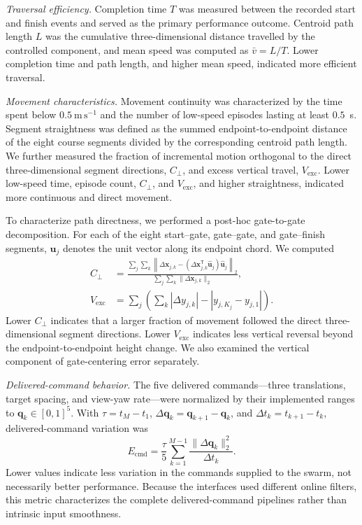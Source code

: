 \emph{Traversal efficiency.}
Completion time $T$ was measured between the recorded start and finish events
and served as the primary performance outcome. Centroid path length $L$ was the
cumulative three-dimensional distance travelled by the controlled component,
and mean speed was computed as $\bar v=L/T$. Lower completion time and path
length, and higher mean speed, indicated more efficient traversal.

\emph{Movement characteristics.}
Movement continuity was characterized by the time spent below $0.5~\mathrm{m\,s^{-1}}$
and the number of low-speed episodes lasting at least $0.5$~s. Segment
straightness was defined as the summed endpoint-to-endpoint distance of the
eight course segments divided by the corresponding centroid path length.
We further measured the fraction of incremental motion orthogonal to the direct
three-dimensional segment directions, $C_{\perp}$, and excess vertical travel,
$V_{\mathrm{exc}}$. Lower low-speed time, episode count, $C_{\perp}$, and
$V_{\mathrm{exc}}$, and higher straightness, indicated more continuous and
direct movement.

To characterize path directness, we performed a post-hoc gate-to-gate
decomposition. For each of the eight start--gate, gate--gate, and gate--finish
segments, $\hat{\mathbf{u}}_j$ denotes the unit vector along its endpoint chord.
We computed
\begin{equation}
\begin{aligned}
C_{\perp}
&=
\frac{
\sum_j\sum_k
\left\|
\Delta\mathbf{x}_{j,k}
-(\Delta\mathbf{x}_{j,k}^{\mathsf T}\hat{\mathbf{u}}_j)
 \hat{\mathbf{u}}_j
\right\|_2
}{
\sum_j\sum_k\lVert\Delta\mathbf{x}_{j,k}\rVert_2
},\\
V_{\mathrm{exc}}
&=
\sum_j
\left(
\sum_k |\Delta y_{j,k}|
-
|y_{j,K_j}-y_{j,1}|
\right).
\end{aligned}
\label{eq:trajectory_geometry}
\end{equation}
Lower $C_{\perp}$ indicates that a larger fraction of movement followed the
direct three-dimensional segment directions. Lower $V_{\mathrm{exc}}$
indicates less vertical reversal beyond the endpoint-to-endpoint height change.
We also examined the vertical component of gate-centering error separately.

\emph{Delivered-command behavior.}
The five delivered commands---three translations, target spacing, and
view-yaw rate---were normalized by their implemented ranges to
$\mathbf{q}_k\in[0,1]^5$. With $\tau=t_M-t_1$,
$\Delta\mathbf{q}_k=\mathbf{q}_{k+1}-\mathbf{q}_k$, and
$\Delta t_k=t_{k+1}-t_k$, delivered-command variation was
\begin{equation}
E_{\mathrm{cmd}}=
\frac{\tau}{5}
\sum_{k=1}^{M-1}
\frac{\lVert\Delta\mathbf{q}_k\rVert_2^2}{\Delta t_k}.
\label{eq:command_metrics}
\end{equation}
Lower values indicate less variation in the commands supplied to the swarm,
not necessarily better performance. Because the interfaces used different
online filters, this metric characterizes the complete delivered-command
pipelines rather than intrinsic input smoothness.


